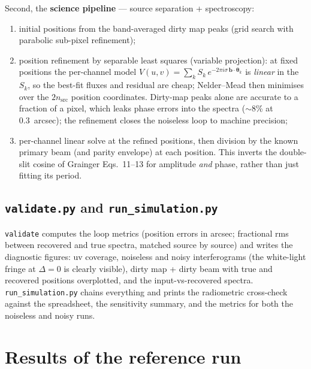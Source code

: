 \documentclass[11pt]{article}
\newcommand{\code}[1]{\texttt{\small #1}}
\newcommand{\file}[1]{\textcolor{plumdark}{\texttt{\small #1}}}
\begin{document}
Second, the \textbf{science pipeline} --- source separation + spectroscopy:
\begin{enumerate}
\item initial positions from the band-averaged dirty map peaks (grid search
with parabolic sub-pixel refinement);
\item position refinement by separable least squares (variable projection):
at fixed positions the per-channel model
$V(u,v) = \sum_k S_k\, e^{-2\pi i\sigma\,\mathbf b\cdot\boldsymbol\theta_k}$
is \emph{linear} in the $S_k$, so the best-fit fluxes and residual are cheap;
Nelder--Mead then minimises over the $2n_\mathrm{src}$ position coordinates.
Dirty-map peaks alone are accurate to a fraction of a pixel, which leaks
phase errors into the spectra ($\sim$8\% at 0.3~arcsec); the refinement
closes the noiseless loop to machine precision;
\item per-channel linear solve at the refined positions, then division by
the known primary beam (and parity envelope) at each position. This inverts
the double-slit cosine of Grainger Eqs.~11--13 for amplitude \emph{and}
phase, rather than just fitting its period.
\end{enumerate}

\subsection{\file{validate.py} and \file{run\_simulation.py}}

\code{validate} computes the loop metrics (position errors in arcsec;
fractional rms between recovered and true spectra, matched source by source)
and writes the diagnostic figures: uv coverage, noiseless and noisy
interferograms (the white-light fringe at $\Delta=0$ is clearly visible),
dirty map + dirty beam with true and recovered positions overplotted, and
the input-vs-recovered spectra. \code{run\_simulation.py} chains everything
and prints the radiometric cross-check against the spreadsheet, the
sensitivity summary, and the metrics for both the noiseless and noisy runs.

\section{Results of the reference run}
\end{document}
